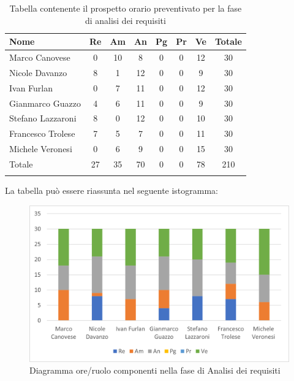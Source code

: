 \begin{longtable}{|l|c|c|c|c|c|c|c|}
	\hline
	\rowcolor{lighter-grayer}
	\textbf{Nome}     & \textbf{Re} & \textbf{Am} & \textbf{An} & \textbf{Pg} & \textbf{Pr} & \textbf{Ve} & \textbf{Totale} \\
	\hline
	\endfirsthead

	\hline
	Marco Canovese    & 0           & 10          & 8           & 0           & 0           & 12          & 30              \\
	\hline
	\hline
	Nicole Davanzo    & 8           & 1           & 12          & 0           & 0           & 9           & 30              \\
	\hline
	\hline
	Ivan Furlan       & 0           & 7           & 11          & 0           & 0           & 12          & 30              \\
	\hline
	\hline
	Gianmarco Guazzo  & 4           & 6           & 11          & 0           & 0           & 9           & 30              \\
	\hline
	\hline
	Stefano Lazzaroni & 8           & 0           & 12          & 0           & 0           & 10          & 30              \\
	\hline
	\hline
	Francesco Trolese & 7           & 5           & 7           & 0           & 0           & 11          & 30              \\
	\hline
	\hline
	Michele Veronesi  & 0           & 6           & 9           & 0           & 0           & 15          & 30              \\
	\hline
	\hline
	Totale            & 27          & 35          & 70          & 0           & 0           & 78          & 210             \\
	\hline
	\rowcolor{white}
	\caption{Tabella contenente il prospetto orario preventivato per la fase di analisi dei requisiti}
\end{longtable}


La tabella può essere riassunta nel seguente istogramma:

\begin{figure}[H]
	\centering
	\includegraphics[width=0.8\linewidth]{res/images/preventivo/1-1.png}
	\caption{Diagramma ore/ruolo componenti nella fase di Analisi dei requisiti}
	\label{fig:diagramma suddivisione ruoli fase analisi dei requisiti}
\end{figure}

